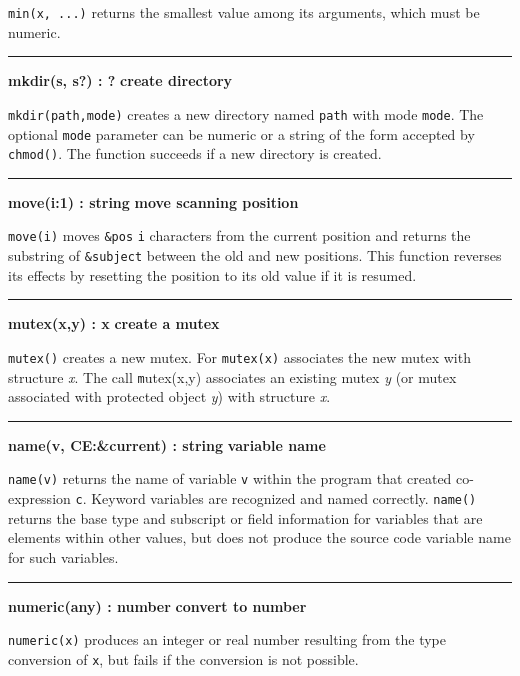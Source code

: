 \noindent
{}\texttt{min(x, ...)} returns the smallest value among its
arguments, which must be numeric.

\bigskip\hrule\vspace{0.1cm}
\noindent
{\bf mkdir(s, s?) : ? } \hfill {\bf create directory}

\noindent
{}
\texttt{mkdir(path,mode)} creates a new directory named \texttt{path} with
mode \texttt{mode}. The optional \texttt{mode} parameter can be numeric or a
string of the form accepted by \texttt{chmod()}. The function succeeds
if a new directory is created.

\bigskip\hrule\vspace{0.1cm}
\noindent
{\bf move(i:1) : string } \hfill {\bf move scanning position}

\noindent
{}\texttt{move(i)} moves \texttt{\&pos} \texttt{i}
characters from the current position and returns the substring of
\texttt{\&subject} between the old and new positions. This function
reverses its effects by resetting the position to its old value if it
is resumed.

\bigskip\hrule\vspace{0.1cm}
\noindent
{\bf mutex(x,y) : x } \hfill {\bf create a mutex}

\noindent
{}\texttt{mutex()} creates a new mutex. For \texttt{mutex(x)}
associates the new mutex with structure {\textit x}.
The call {\texttt mutex(x,y)} associates an existing mutex \textit{y} (or
mutex associated with protected object \textit{y}) with
structure {\textit x}.

\bigskip\hrule\vspace{0.1cm}
\noindent
{\bf name(v, CE:\&current) : string } \hfill {\bf variable name}

\noindent
{}\texttt{name(v)} returns the name of variable \texttt{v}
within the program that created co-expression \texttt{c}. Keyword
variables are recognized and named correctly. \texttt{name()} returns
the base type and subscript or field information for variables that are
elements within other values, but does not produce the source code
variable name for such variables. 

\bigskip\hrule\vspace{0.1cm}
\noindent
{\bf numeric(any) : number } \hfill {\bf convert to number}

\noindent
{}\texttt{numeric(x)} produces an integer or real
number resulting from the type conversion of \texttt{x}, but fails if
the conversion is not possible.

